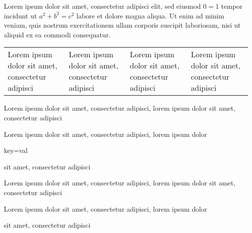 Lorem ipsum dolor sit amet, consectetur adipisci elit, sed eiusmod \(0 = 1\) tempor incidunt ut $a^{2} + b^{2} = c^{2}$ labore et dolore magna aliqua.  Ut enim ad minim veniam, quis nostrum exercitationem ullam corporis suscipit laboriosam, nisi ut aliquid ex ea commodi consequatur.

\begin{tabular}{| l | l | l | l |}
  Lorem ipsum dolor sit amet, consectetur adipisci & Lorem ipsum dolor sit amet, consectetur adipisci & Lorem ipsum dolor sit amet, consectetur adipisci & Lorem ipsum dolor sit amet, consectetur adipisci
\end{tabular}

Lorem ipsum dolor sit amet, consectetur adipisci,
lorem ipsum dolor
\captionsetup{key=val}
sit amet, consectetur adipisci

Lorem ipsum dolor sit amet, consectetur adipisci,
lorem ipsum dolor
\caption{key=val}
sit amet, consectetur adipisci

Lorem ipsum dolor sit amet, consectetur adipisci,
lorem ipsum dolor
\parencite{key}
sit amet, consectetur adipisci

Lorem ipsum dolor sit amet, consectetur adipisci,
lorem ipsum dolor
\par
sit amet, consectetur adipisci
